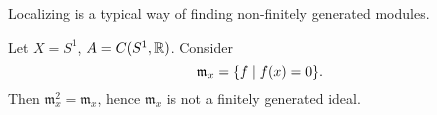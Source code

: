 \begin{note}
  Localizing is a typical way of finding non-finitely generated modules.
\end{note}

\begin{example}
  Let $X = S^1$, $A = C(S^1, \mathbb R)$. Consider
  \[ \mathfrak m_x = \{ f \mathrel{|} f(x) = 0 \}. \]
  Then $\mathfrak m_x^2 = \mathfrak m_x$, hence $\mathfrak m_x$ is not a finitely generated ideal.
\end{example}


